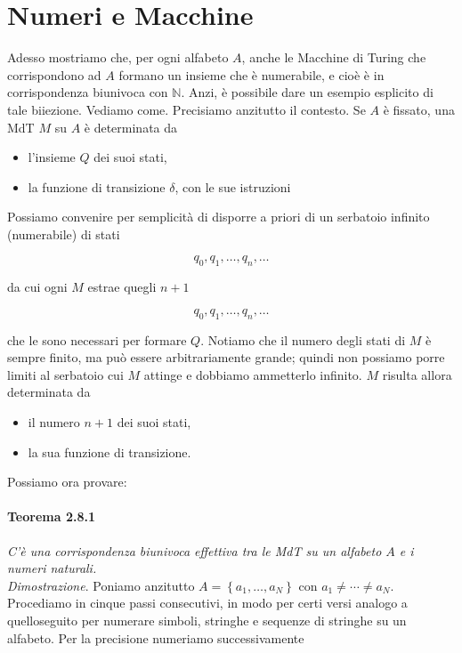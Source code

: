 \section{Numeri e Macchine}

Adesso mostriamo che, per ogni alfabeto $A$, anche le Macchine di Turing che
corrispondono ad $A$ formano un insieme che è numerabile, e cioè è in corrispondenza
biunivoca con $\mathbb{N}$. Anzi, è possibile dare un esempio esplicito di tale biiezione.
Vediamo come. Precisiamo anzitutto il contesto. Se $A$ è fissato, una MdT $M$ su $A$
è determinata da

\begin{itemize}
    \item l'insieme $Q$ dei suoi stati,
    \item la funzione di transizione $\delta$, con le
          sue istruzioni
\end{itemize}

Possiamo convenire per semplicità di disporre a priori di un serbatoio infinito
(numerabile) di stati

\[
    q_0, q_1, \ldots, q_n, \ldots
\]

da cui ogni $M$ estrae quegli $n+1$

\[
    q_0, q_1, \ldots, q_n, \ldots
\]

che le sono necessari per formare $Q$. Notiamo che il numero degli stati di $M$ è
sempre finito, ma può essere arbitrariamente grande; quindi non possiamo porre
limiti al serbatoio cui $M$ attinge e dobbiamo ammetterlo infinito. $M$ risulta allora
determinata da

\begin{itemize}
    \item il numero $n + 1$ dei suoi stati,
    \item la sua funzione di transizione.
\end{itemize}

Possiamo ora provare:

\paragraph{Teorema 2.8.1} \textit{C'è una corrispondenza biunivoca effettiva tra le MdT su un
    alfabeto $A$ e i numeri naturali.}\\

\textit{Dimostrazione}. Poniamo anzitutto $A=\left\{a_1, \ldots, a_N\right\}$ con
$a_1 \neq \cdots \neq a_N$. Procediamo in cinque passi consecutivi, in modo per certi
versi analogo a quelloseguito per numerare simboli, stringhe e sequenze di stringhe
su un alfabeto. Per la precisione numeriamo successivamente


